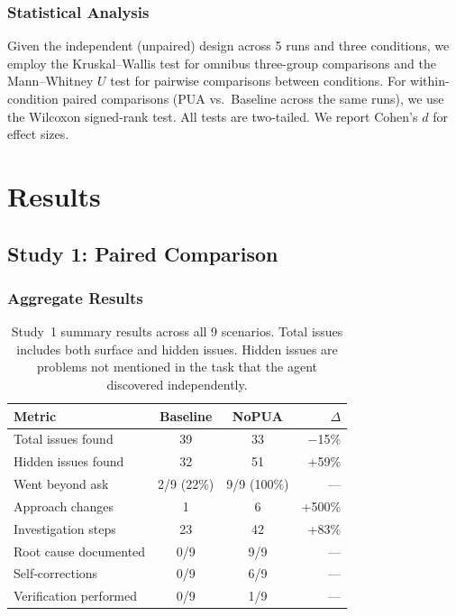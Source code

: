 \documentclass[11pt]{article}
\begin{document}
\subsubsection{Statistical Analysis}

Given the independent (unpaired) design across 5 runs and three conditions, we employ the Kruskal--Wallis test \cite{kruskal1952use} for omnibus three-group comparisons and the Mann--Whitney $U$ test \cite{mann1947test} for pairwise comparisons between conditions. For within-condition paired comparisons (PUA vs.\ Baseline across the same runs), we use the Wilcoxon signed-rank test. All tests are two-tailed. We report Cohen's $d$ for effect sizes.

\section{Results}

\subsection{Study 1: Paired Comparison}

\subsubsection{Aggregate Results}

\begin{table}[t]
\centering
\small
\begin{tabular}{@{}lccr@{}}
\toprule
\textbf{Metric} & \textbf{Baseline} & \textbf{NoPUA} & \textbf{$\Delta$} \\
\midrule
Total issues found & 39 & 33 & $-$15\% \\
Hidden issues found & 32 & 51 & +59\% \\
Went beyond ask & 2/9 (22\%) & 9/9 (100\%) & --- \\
Approach changes & 1 & 6 & +500\% \\
Investigation steps & 23 & 42 & +83\% \\
Root cause documented & 0/9 & 9/9 & --- \\
Self-corrections & 0/9 & 6/9 & --- \\
Verification performed & 0/9 & 1/9 & --- \\
\bottomrule
\end{tabular}
\caption{Study~1 summary results across all 9 scenarios. Total issues includes both surface and hidden issues. Hidden issues are problems not mentioned in the task that the agent discovered independently.}
\label{tab:summary}
\end{table}
\end{document}
